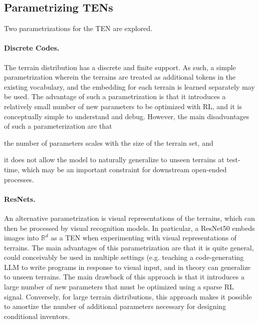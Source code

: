 \documentclass{article}
\def\sR{{\mathbb{R}}}
\begin{document}



\subsection{Parametrizing TENs}

\label{sec:ten-parametrization}
Two parametrizations for the TEN are explored. 
\paragraph{Discrete Codes.}
The terrain distribution has a discrete and finite support. 
As such, a simple parametrization wherein the terrains are treated as additional tokens in the existing vocabulary, and the embedding for each terrain is learned separately may be used.
The advantage of such a parametrization is that it introduces a relatively small number of new parameters to be optimized 
with RL, and it is conceptually simple to understand and debug.
However, the main disadvantages of such a parameterization are that
\begin{inlinelist}
    \item the number of parameters scales with the size of the terrain set, and 
    \item it does not allow the model to naturally generalize to unseen terrains at test-time, which may be an important constraint for downstream open-ended processes.
\end{inlinelist}

\paragraph{ResNets.}
An alternative parametrization is visual representations of the terrains, which can then be processed by visual recognition models. 
In particular, a ResNet50 \citep{he:arxiv15} embeds images into $\sR^d$ as a TEN when experimenting with visual representations of terrains.
The main advantages of this parametrization are that it is quite general, could conceivably be used in multiple settings (e.g. teaching a code-generating LLM to write programs in response to visual input, and in theory can generalize to unseen terrains.
The main drawback of this approach is that it introduces a large number of new parameters that must be optimized using a sparse RL signal.
Conversely, for large terrain distributions, this approach makes it possible to amortize 
the number of additional parameters necessary for designing conditional inventors.
\end{document}
